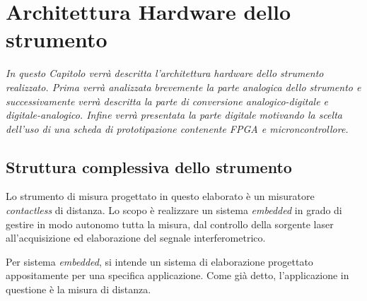 \chapter{Architettura Hardware dello strumento}
\label{capitolo3}
\thispagestyle{empty}

\textit{In questo Capitolo verrà descritta l'architettura hardware dello strumento realizzato. Prima verrà analizzata brevemente la parte analogica dello strumento e successivamente verrà descritta la parte di conversione analogico-digitale e digitale-analogico. Infine verrà presentata la parte digitale motivando la scelta dell'uso di una scheda di prototipazione contenente FPGA e microncontrollore.}

\section{Struttura complessiva dello strumento}
Lo strumento di misura progettato in questo elaborato è un misuratore \textit{contactless} di distanza. Lo scopo è realizzare un sistema \textit{embedded} in grado di gestire in modo autonomo tutta la misura, dal controllo della sorgente laser all'acquisizione ed elaborazione del segnale interferometrico.

Per sistema \textit{embedded}, si intende un sistema di elaborazione progettato appositamente per una specifica applicazione. Come già detto, l'applicazione in questione è la misura di distanza. 

